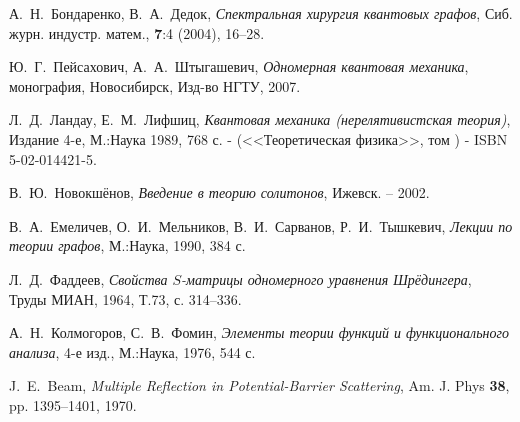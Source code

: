 \documentclass[a4 paper, 12 pt]{extarticle}
\newcommand{\RomanNumeralCaps}[1]
{\MakeUppercase{\romannumeral #1}}
\begin{document}
\begin{thebibliography}{1}
	 А.~Н.~Бондаренко, В.~А.~Дедок, {\it Спектральная хирургия квантовых графов}, Сиб. журн. индустр. матем., \textbf{7}:4 (2004), 16--28.
	
	 Ю.~Г.~Пейсахович, А.~А.~Штыгашевич, {\it Одномерная квантовая механика}, монография, Новосибирск, Изд-во НГТУ, 2007.
	
	 Л.~Д.~Ландау, Е.~М.~Лифшиц, {\it Квантовая механика (нерелятивистская теория)}, Издание 4-е, М.:Наука 1989, 768 с. - (<<Теоретическая физика>>, том \RomanNumeralCaps{3}) - ISBN 5-02-014421-5.
	
	 В.~Ю.~Новокшёнов, {\it Введение в теорию солитонов}, Ижевск. – 2002.
	
	 В.~А.~Емеличев, О.~И.~Мельников, В.~И.~Сарванов, Р.~И.~Тышкевич, {\it Лекции по теории графов}, М.:Наука, 1990, 384 с.
	
	 Л.~Д.~Фаддеев, {\it Свойства $S$-матрицы одномерного уравнения Шрёдингера}, Труды МИАН, 1964, Т.73, с. 314--336.
	
	 А.~Н.~Колмогоров, С.~В.~Фомин, {\it Элементы теории функций и функционального анализа}, 4-е изд., М.:Наука, 1976, 544 с.
	
	 J.~E.~Beam, {\it Multiple Reflection in Potential-Barrier Scattering}, Am. J. Phys \textbf{38}, pp. 1395--1401, 1970.
	
	
	
\end{thebibliography}
\end{document}
